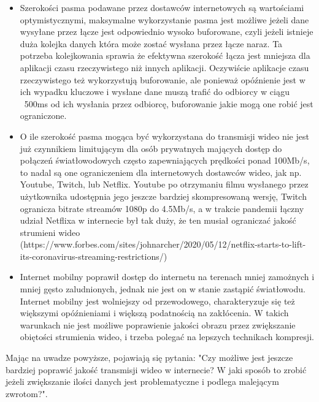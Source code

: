 \begin{itemize}
      \item Szerokości pasma podawane przez dostawców internetowych są wartościami optymistycznymi,
            maksymalne wykorzystanie pasma jest możliwe jeżeli dane wysyłane przez łącze jest
            odpowiednio wysoko buforowane, czyli jeżeli istnieje duża kolejka danych która może
            zostać wysłana przez łącze naraz. Ta potrzeba kolejkowania sprawia że efektywna
            szerokość łącza jest mniejsza dla aplikacji czasu rzeczywistego niż innych aplikacji.
            Oczywiście aplikacje czasu rzeczywistego też wykorzystują buforowanie, ale ponieważ
            opóźnienie jest w ich wypadku kluczowe i wysłane dane muszą trafić do odbiorcy w ciągu
            ~500ms od ich wysłania przez odbiorcę, buforowanie jakie mogą one robić jest
            ograniczone.
            
      \item O ile szerokość pasma mogąca być wykorzystana do transmisji wideo nie jest już
            czynnikiem limitującym dla osób prywatnych mających dostęp do połączeń światłowodowych
            często zapewniających prędkości ponad 100Mb/s, to nadal są one ograniczeniem dla
            internetowych dostawców wideo, jak np. Youtube, Twitch, lub Netflix. Youtube po
            otrzymaniu filmu wysłanego przez użytkownika udostępnia jego jeszcze bardziej
            skompresowaną wersję, Twitch ogranicza bitrate streamów 1080p do 4.5Mb/s, a w trakcie
            pandemii łączny udział Netflixa w internecie był tak duży, że ten musiał ograniczać
            jakość strumieni wideo
            (https://www.forbes.com/sites/johnarcher/2020/05/12/netflix-starts-to-lift-its-coronavirus-streaming-restrictions/)
            
      \item Internet mobilny poprawił dostęp do internetu na terenach mniej zamożnych i mniej gęsto
            zaludnionych, jednak nie jest on w stanie zastąpić światłowodu. Internet mobilny jest
            wolniejszy od przewodowego, charakteryzuje się też większymi opóźnieniami i większą
            podatnością na zakłócenia. W takich warunkach nie jest możliwe poprawienie jakości
            obrazu przez zwiększanie obiętości strumienia wideo, i trzeba polegać na lepszych
            technikach kompresji.
\end{itemize}

Mając na uwadze powyższe, pojawiają się pytania: "Czy możliwe jest jeszcze bardziej poprawić jakość
transmisji wideo w internecie? W jaki sposób to zrobić jeżeli zwiększanie ilości danych jest
problematyczne i podlega malejącym zwrotom?".

